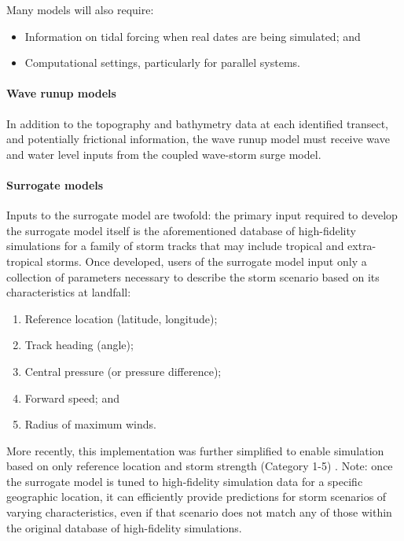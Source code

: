 \noindent
Many models will also require:

\begin{itemize}
    \item Information on tidal forcing when real dates are being simulated; and
        \vspace{2mm}
    \item Computational settings, particularly for parallel systems.
\end{itemize}

\paragraph{Wave runup models} In addition to the topography and bathymetry data at each identified transect, and potentially frictional information, the wave runup model must receive wave and water level inputs from the coupled wave-storm surge model.


\paragraph{Surrogate models} Inputs to the surrogate model are twofold: the primary input required to develop the surrogate model itself is the aforementioned database of high-fidelity simulations for a family of storm tracks that may include tropical and extra-tropical storms. Once developed, users of the surrogate model input only a collection of parameters necessary to describe the storm scenario based on its characteristics at landfall: 

\begin{enumerate}
    \item Reference location (latitude, longitude);
        \vspace{2mm}
    \item Track heading (angle);
        \vspace{2mm}
    \item Central pressure (or pressure difference);
        \vspace{2mm}
    \item Forward speed; and
        \vspace{2mm}
    \item Radius of maximum winds.
\end{enumerate}

More recently, this implementation was further simplified to enable simulation based on only reference location and storm strength (Category 1-5) \citep{njcoast2018implementation}. Note: once the surrogate model is tuned to high-fidelity simulation data for a specific geographic location, it can efficiently provide predictions for storm scenarios of varying characteristics, even if that scenario does not match any of those within the original database of high-fidelity simulations. 

